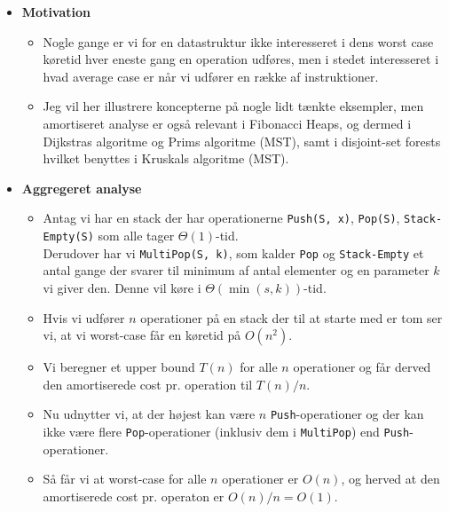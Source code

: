 \begin{itemize}
\item \textbf{Motivation}
\begin{itemize}
	\item Nogle gange er vi for en datastruktur ikke interesseret i dens worst case køretid hver eneste gang en operation udføres, men i stedet interesseret i hvad average case er når vi udfører en række af instruktioner.
	\item Jeg vil her illustrere koncepterne på nogle lidt tænkte eksempler, men amortiseret analyse er også relevant i Fibonacci Heaps, og dermed i Dijkstras algoritme og Prims algoritme (MST), samt i disjoint-set forests hvilket benyttes i Kruskals algoritme (MST).
\end{itemize}


\item \textbf{Aggregeret analyse}
\begin{itemize}
	\item Antag vi har en stack der har operationerne \texttt{Push(S, x)}, \texttt{Pop(S)}, \texttt{Stack-Empty(S)} som alle tager $\Theta(1)$-tid.\\
	Derudover har vi \texttt{MultiPop(S, k)}, som kalder \texttt{Pop} og \texttt{Stack-Empty} et antal gange der svarer til minimum af antal elementer og en parameter $k$ vi giver den. Denne vil køre i $\Theta(\min(s, k))$-tid.
	\item Hvis vi udfører $n$ operationer på en stack der til at starte med er tom ser vi, at vi worst-case får en køretid på $O(n^2)$.
	\item Vi beregner et upper bound $T(n)$ for alle $n$ operationer og får derved den amortiserede cost pr. operation til $T(n)/n$.
	\item Nu udnytter vi, at der højest kan være $n$ \texttt{Push}-operationer og der kan ikke være flere \texttt{Pop}-operationer (inklusiv dem i \texttt{MultiPop}) end \texttt{Push}-operationer.
	\item Så får vi at worst-case for alle $n$ operationer er $O(n)$, og herved at den amortiserede cost pr. operaton er $O(n)/n = O(1)$.
\end{itemize}


\end{itemize}
